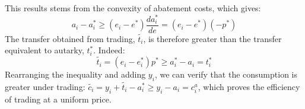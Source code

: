 \documentclass[12pt,english]{article}
\begin{document}



This results stems from the convexity of abatement costs, which gives: $$a_i - a^*_i \geq (e_i - e^*) \frac{da^*_i}{de} = (e_i - e^*) (-p^*)$$ 
The transfer obtained from trading, $\widetilde{t_i}$, is therefore greater than the transfer equivalent to autarky, $t^*_i$. Indeed: $$\widetilde{t_i} = (e_i - e^*_i ) p^* \geq a^*_i - a_i = t^*_i$$
Rearranging the inequality and adding $y_i$, we can verify that the consumption is greater under trading: %
$\widetilde{c_i} = y_i + \widetilde{t_i} - a^*_i \geq y_i - a_i = c^a_i$, which proves the efficiency of trading at a uniform price.


\end{document}
